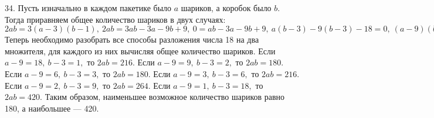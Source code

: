 34. Пусть изначально в каждом пакетике было $a$ шариков, а коробок было $b.$ Тогда приравняем общее количество шариков в двух случаях: $2ab=3(a-3)(b-1),\ 2ab=3ab-3a-9b+9,\ 0=ab-3a-9b+9,\ a(b-3)-9(b-3)-18=0,\ (a-9)(b-3)=18.$ Теперь необходимо разобрать все способы разложения числа 18 на два множителя, для каждого из них вычисляя общее количество шариков. Если $a-9=18,\ b-3=1,$ то $2ab=216.$ Если $a-9=9,\ b-3=2,$ то $2ab=180.$ Если $a-9=6,\ b-3=3,$ то $2ab=180.$ Если $a-9=3,\ b-3=6,$ то $2ab=216.$ Если $a-9=2,\ b-3=9,$ то $2ab=264.$ Если $a-9=1,\ b-3=18,$ то $2ab=420.$ Таким образом, наименьшее возможное количество шариков равно 180, а наибольшее --- 420.\\
